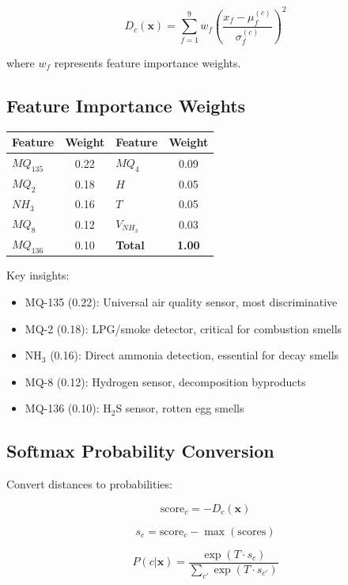 \documentclass[10pt]{article}
\begin{document}
\[
D_c(\mathbf{x}) = \sum_{f=1}^{9} w_f \left(\frac{x_f - \mu_f^{(c)}}{\sigma_f^{(c)}}\right)^2
\]

where $w_f$ represents feature importance weights.

\subsection{Feature Importance Weights}

\begin{table}[H]
\centering
\begin{tabular}{|l|c|l|c|}
\hline
\textbf{Feature} & \textbf{Weight} & \textbf{Feature} & \textbf{Weight} \\
\hline
$MQ_{135}$ & 0.22 & $MQ_4$ & 0.09 \\
$MQ_2$ & 0.18 & $H$ & 0.05 \\
$NH_3$ & 0.16 & $T$ & 0.05 \\
$MQ_8$ & 0.12 & $V_{NH_3}$ & 0.03 \\
$MQ_{136}$ & 0.10 & \textbf{Total} & \textbf{1.00} \\
\hline
\end{tabular}
\end{table}

Key insights:
\begin{itemize}
    \item MQ-135 (0.22): Universal air quality sensor, most discriminative
    \item MQ-2 (0.18): LPG/smoke detector, critical for combustion smells
    \item NH$_3$ (0.16): Direct ammonia detection, essential for decay smells
    \item MQ-8 (0.12): Hydrogen sensor, decomposition byproducts
    \item MQ-136 (0.10): H$_2$S sensor, rotten egg smells
\end{itemize}

\subsection{Softmax Probability Conversion}

Convert distances to probabilities:

\[
\text{score}_c = -D_c(\mathbf{x})
\]

\[
s_c = \text{score}_c - \max(\text{scores})
\]

\[
P(c|\mathbf{x}) = \frac{\exp(T \cdot s_c)}{\sum_{c'} \exp(T \cdot s_{c'})}
\]
\end{document}

